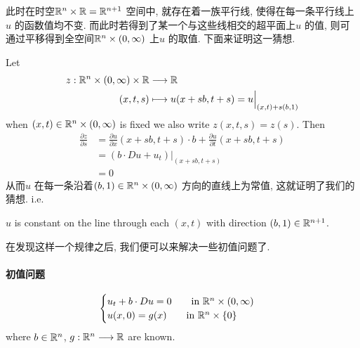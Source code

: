 	\vspace*{1em}
	
	此时在时空$\mathbb{R}^n \times \mathbb{R} = \mathbb{R}^{n + 1}$ 空间中, 就存在着一族平行线, 使得在每一条平行线上$u$ 的函数值均不变. 而此时若得到了某一个与这些线相交的超平面上$u$ 的值, 则可通过平移得到全空间$\mathbb{R}^n \times (0 , \infty)$ 上$u$ 的取值. 下面来证明这一猜想.
	
	\vspace*{6em}
	
	Let
	\begin{align}
		z : \mathbb{R}^n \times (0 , \infty) \times \mathbb{R} &\longrightarrow \mathbb{R} \\
		(x , t , s) &\longmapsto u(x + sb , t + s) = u \Big|_{(x , t) + s(b , 1)}
	\end{align}
	when $(x , t) \in \mathbb{R}^n \times (0 , \infty)$ is fixed we also write $z(x , t , s) = z(s)$. Then
	\begin{align}
		\frac{\partial z}{\partial s} 
		&= \frac{\partial u}{\partial x}(x + sb , t + s) \cdot b + \frac{\partial u}{\partial t}(x + sb , t + s) \\
		&= \left( b \cdot Du + u_{t} \right) \Big|_{(x + sb , t + s)} \\
		&= 0
	\end{align}
	从而$u$ 在每一条沿着$(b , 1) \in \mathbb{R}^n \times (0 , \infty)$ 方向的直线上为常值, 这就证明了我们的猜想. i.e.
	\begin{center}
		$u$ is constant on the line through each $(x , t)$ with direction $(b , 1) \in \mathbb{R}^{n + 1}$.
	\end{center}
	
	\vspace*{4em}
	
	在发现这样一个规律之后, 我们便可以来解决一些初值问题了.
	
\newpage
\paragraph{初值问题}
	\begin{align}
		\begin{cases}
			u_t + b \cdot Du = 0 \hspace*{2em} \text{in} \,\, \mathbb{R}^n \times (0 , \infty) \\
			u(x , 0) = g(x) \hspace*{2em} \text{in} \,\, \mathbb{R}^n \times \{ 0 \}
		\end{cases}
	\end{align}
	where $b \in \mathbb{R}^n$, $g : \mathbb{R}^n \longrightarrow \mathbb{R}$ are known. 
	

